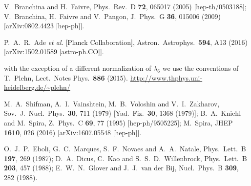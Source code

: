 \documentclass[aps,prd,11pt,tightenlines,superscriptaddress,nofootinbib,preprintnumbers,notitlepage]{revtex4-1}
\begin{document}
\begin{thebibliography}{99}
  V.~Branchina and H.~Faivre,
  Phys.\ Rev.\ D {\bf 72}, 065017 (2005)
  [hep-th/0503188];
  V.~Branchina, H.~Faivre and V.~Pangon,
  J.\ Phys.\ G {\bf 36}, 015006 (2009)
  [arXiv:0802.4423 [hep-ph]].
  
  P.~A.~R.~Ade {\it et al.} [Planck Collaboration],
  Astron.\ Astrophys.\  {\bf 594}, A13 (2016)
  [arXiv:1502.01589 [astro-ph.CO]].

 with the exception of a different normalization of
  $\lambda_6$ we use the conventions of T.~Plehn,
  Lect.\ Notes Phys.\  {\bf 886} (2015).
  \url{http://www.thphys.uni-heidelberg.de/~plehn/}

  M.~A.~Shifman, A.~I.~Vainshtein, M.~B.~Voloshin and V.~I.~Zakharov,
  Sov.\ J.\ Nucl.\ Phys.\  {\bf 30}, 711 (1979)
  [Yad.\ Fiz.\  {\bf 30}, 1368 (1979)];
  B.~A.~Kniehl and M.~Spira,
  Z.\ Phys.\ C {\bf 69}, 77 (1995)
  [hep-ph/9505225];
  M.~Spira,
  JHEP {\bf 1610}, 026 (2016)
  [arXiv:1607.05548 [hep-ph]].

  O.~J.~P.~Eboli, G.~C.~Marques, S.~F.~Novaes and A.~A.~Natale,
  Phys.\ Lett.\ B {\bf 197}, 269 (1987);
  D.~A.~Dicus, C.~Kao and S.~S.~D.~Willenbrock,
  Phys.\ Lett.\ B {\bf 203}, 457 (1988);
  E.~W.~N.~Glover and J.~J.~van der Bij,
  Nucl.\ Phys.\ B {\bf 309}, 282 (1988).


\end{thebibliography}
\end{document}
